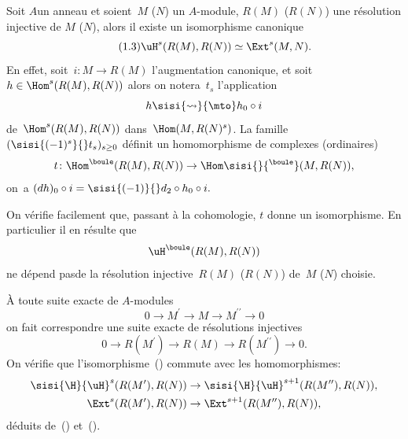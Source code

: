 Soit $A$\pageoriginale un anneau et soient~$M$ (\resp $N$) un $A$-module, $R(M)$ (\resp $R(N)$) une r\'esolution injective de $M$ (\resp $N$), alors il existe un isomorphisme canonique
\begin{equation*} \label{eq:V.1.3} \tag{1.3} \uH^{s}(R(M), R(N))\simeq\Ext^{s}(M, N).
\end{equation*}
En effet, soit~$i\colon M\to R(M)$ l'augmentation canonique, et soit $h\in\Hom^{s}(R(M), R(N))$ alors on notera~$t_{s}$ l'application
$$h\sisi{\rightsquigarrow}{\mto} h_{0}\circ i$$
de~$\Hom^{s}(R(M), R(N))$ dans~$\Hom(M, R(N)^s)$. La famille $(\sisi{(-1)^{s}}{}t_{s})_{s\geq 0}$ d\'efinit un homomorphisme de complexes (ordinaires)
$$t\colon\Hom^{\boule}(R(M), R(N))\to\Hom\sisi{}{^\boule}(M, R(N)),
$$
\ie on~a $(dh)_{0}\circ i=\sisi{(-1)}{} d_{2}\circ h_{0}\circ i.$

On v\'erifie facilement que, passant \`a la cohomologie, $t$ donne un isomorphisme. En particulier il en r\'esulte que
$$
\uH^{\boule}(R(M), R(N))$$
ne \og d\'epend pas\fg de la r\'esolution injective~$R(M)$ (\resp $R(N)$) de~$M$ (\resp $N$) choisie.

\`A toute suite exacte de $A$-modules
\begin{equation} \label{eq:V.5} 0\to M^{\prime}\to M\to M^{\prime\prime}\to 0
\end{equation}
on fait correspondre une suite exacte de r\'esolutions injectives
\begin{equation} \label{eq:V.6} 0\to R(M^{\prime})\to R(M)\to R(M^{\prime\prime})\to 0.
\end{equation}
On v\'erifie que l'isomorphisme~() commute avec les homomorphismes: \setcounter{equation}{7}
\begin{align} \label{eq:V.8}
\sisi{\H}{\uH}^{s}(R(M^{\prime}), R(N))&\to \sisi{\H}{\uH}^{s+1}(R(M^{\prime\prime}), R(N)),\\
\label{eq:V.9} \Ext^{s}(R(M^{\prime}), R(N))&\to\Ext^{s+1}(R(M^{\prime\prime}), R(N)),
\end{align}
d\'eduits de~() et~().

